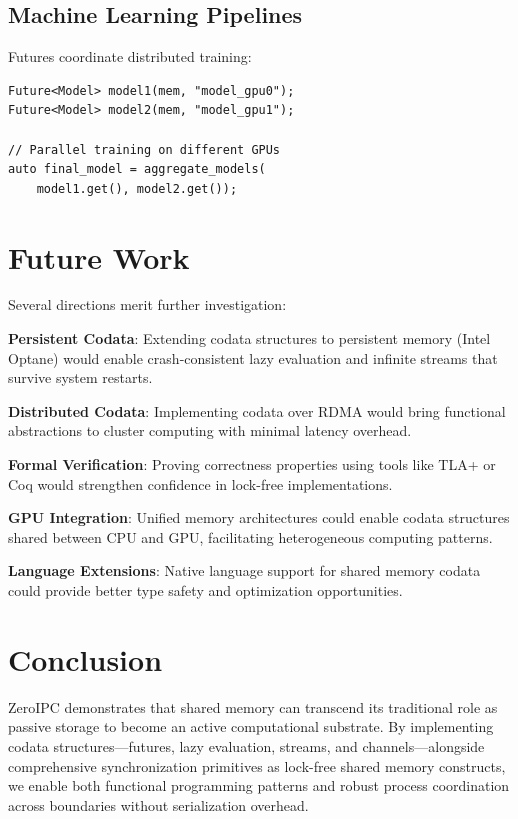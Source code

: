 \documentclass[10pt,conference]{IEEEtran}
\begin{document}
\subsection{Machine Learning Pipelines}

Futures coordinate distributed training:

\begin{lstlisting}[caption={Distributed Training},label={lst:ml}]
Future<Model> model1(mem, "model_gpu0");
Future<Model> model2(mem, "model_gpu1");

// Parallel training on different GPUs
auto final_model = aggregate_models(
    model1.get(), model2.get());
\end{lstlisting}

\section{Future Work}

Several directions merit further investigation:

\textbf{Persistent Codata}: Extending codata structures to persistent memory (Intel Optane) would enable crash-consistent lazy evaluation and infinite streams that survive system restarts.

\textbf{Distributed Codata}: Implementing codata over RDMA would bring functional abstractions to cluster computing with minimal latency overhead.

\textbf{Formal Verification}: Proving correctness properties using tools like TLA+ or Coq would strengthen confidence in lock-free implementations.

\textbf{GPU Integration}: Unified memory architectures could enable codata structures shared between CPU and GPU, facilitating heterogeneous computing patterns.

\textbf{Language Extensions}: Native language support for shared memory codata could provide better type safety and optimization opportunities.

\section{Conclusion}

ZeroIPC demonstrates that shared memory can transcend its traditional role as passive storage to become an active computational substrate. By implementing codata structures---futures, lazy evaluation, streams, and channels---alongside comprehensive synchronization primitives as lock-free shared memory constructs, we enable both functional programming patterns and robust process coordination across boundaries without serialization overhead.
\end{document}
